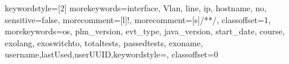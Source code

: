 

{
keywordstyle=[2]
morekeywords={interface, Vlan, line, ip, hostname, no},
sensitive=false,
morecomment=[l]{!},
morecomment=[s]{/*}{*/},
classoffset=1,
morekeywords={os, plm_version, evt_type, java_version, start_date, course, exolang, exoswitchto, totaltests, passedtests, exoname, username,lastUsed,userUUID},keywordstyle=\color{blue},
classoffset=0
}